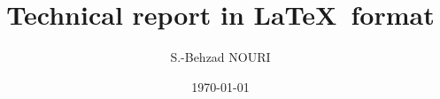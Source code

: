 \title{Technical report in \LaTeX ~format}
\author{S.-Behzad NOURI}
\date{\today}  
\maketitle
\thispagestyle{empty} 
\tableofcontents 
\newpage


